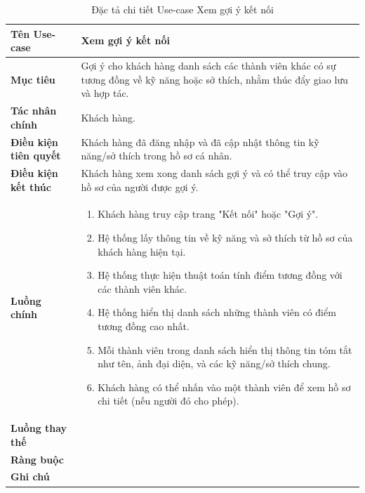 \begin{table}[H]
\centering
\renewcommand{\arraystretch}{1.3}
\begin{tabular}{|p{4cm}|p{10cm}|}
\hline
\textbf{Tên Use-case} 
& Xem gợi ý kết nối \\ 
\hline

\textbf{Mục tiêu} 
& Gợi ý cho khách hàng danh sách các thành viên khác có sự tương đồng về kỹ năng hoặc sở thích, nhằm thúc đẩy giao lưu và hợp tác. \\ 
\hline

\textbf{Tác nhân chính} 
& Khách hàng. \\ 
\hline

\textbf{Điều kiện tiên quyết} 
& Khách hàng đã đăng nhập và đã cập nhật thông tin kỹ năng/sở thích trong hồ sơ cá nhân. \\ 
\hline

\textbf{Điều kiện kết thúc} 
& Khách hàng xem xong danh sách gợi ý và có thể truy cập vào hồ sơ của người được gợi ý. \\ 
\hline

\textbf{Luồng chính} 
& 
\begin{enumerate}
    \item Khách hàng truy cập trang "Kết nối" hoặc "Gợi ý".
    \item Hệ thống lấy thông tin về kỹ năng và sở thích từ hồ sơ của khách hàng hiện tại.
    \item Hệ thống thực hiện thuật toán tính điểm tương đồng với các thành viên khác.
    \item Hệ thống hiển thị danh sách những thành viên có điểm tương đồng cao nhất.
    \item Mỗi thành viên trong danh sách hiển thị thông tin tóm tắt như tên, ảnh đại diện, và các kỹ năng/sở thích chung.
    \item Khách hàng có thể nhấn vào một thành viên để xem hồ sơ chi tiết (nếu người đó cho phép).
\end{enumerate} \\ 
\hline

\textbf{Luồng thay thế} 
& 
 \\ 
\hline

\textbf{Ràng buộc} 
\\ 
\hline

\textbf{Ghi chú} 
 \\ 
\hline
\end{tabular}
\caption{Đặc tả chi tiết Use-case Xem gợi ý kết nối}
\label{tab:matching-spec}
\end{table}
